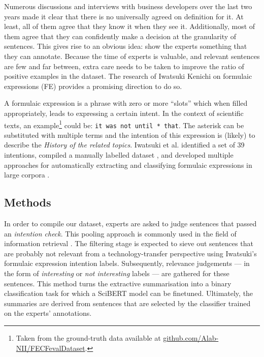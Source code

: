 Numerous discussions and interviews with business developers over the last two years made it clear that there is no universally agreed on definition for it. At least, all of them agree that they know it when they see it. Additionally, most of them agree that they can confidently make a decision at the granularity of sentences. This gives rise to an obvious idea: show the experts something that they can annotate. Because the time of experts is valuable, and relevant sentences are few and far between, extra care needs to be taken to improve the ratio of positive examples in the dataset. The research of Iwatsuki Kenichi on formulaic expressions (FE) \cite{iwatsuki2020evaluation,iwatsuki2021extraction,iwatsuki2021communicative,iwatsuki2022extraction} provides a promising direction to do so. 

A formulaic expression is a phrase with zero or more ``slots'' which when filled appropriately, leads to expressing a certain intent. In the context of scientific texts, an example\footnote{Taken from the ground-truth data available at \href{https://github.com/Alab-NII/FECFevalDataset/blob/master/human_evaluation/background.tsv}{github.com/Alab-NII/FECFevalDataset}.} could be: \texttt{it was not until * that}. The asterisk can be substituted with multiple terms and the intention of this expression is (likely) to describe the \textit{History of the related topics}. Iwatsuki et al. identified a set of 39 intentions, compiled a manually labelled dataset \cite{iwatsuki2020evaluation}, and developed multiple approaches for automatically extracting and classifying formulaic expressions in large corpora \cite{iwatsuki2021communicative,iwatsuki2022extraction}.

\subsection{Methods}

In order to compile our dataset, experts are asked to judge sentences that passed an \textit{intention check}. This pooling approach is commonly used in the field of information retrieval \cite{schutze2008introduction}. The filtering stage is expected to sieve out sentences that are probably not relevant from a technology-transfer perspective using Iwatsuki's formulaic expression intention labels. Subsequently, relevance judgements --- in the form of \textit{interesting} or \textit{not interesting} labels --- are gathered for these sentences. This method turns the extractive summarisation into a binary classification task for which a SciBERT model \cite{beltagy2019scibert} can be finetuned. Ultimately, the summaries are derived from sentences that are selected by the classifier trained on the experts' annotations.

